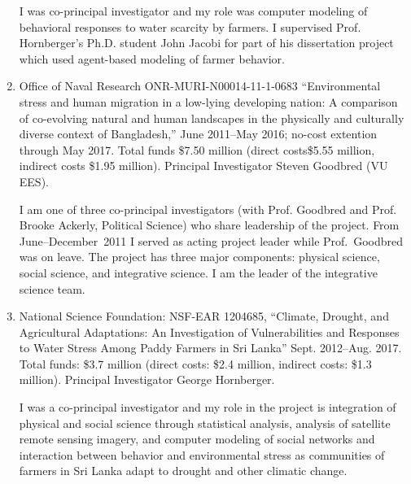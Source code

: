\begin{enumerate}
\begin{credit}
I was co-principal investigator and my role was computer modeling of behavioral responses to water scarcity by farmers. I supervised Prof. Hornberger's Ph.D. student John Jacobi for part of his dissertation project which used agent-based modeling of farmer behavior.
\end{credit}
	\item Office of Naval Research ONR-MURI-N00014-11-1-0683 ``Environmental stress and human migration in a low-lying developing nation: A comparison of co-evolving natural and human landscapes in the physically and culturally diverse context of Bangladesh,'' June 2011--May 2016; no-cost extention through May 2017. Total funds \$7.50 million (direct costs\$5.55 million, indirect costs \$1.95 million). Principal Investigator Steven Goodbred (VU EES).
\begin{credit}
I am one of three co-principal investigators (with Prof. Goodbred and Prof. Brooke Ackerly, Political Science) who share leadership of the project. From June--December~2011 I served as acting project leader while Prof.~Goodbred was on leave. The project has three major components: physical science, social science, and integrative science. I am the leader of the integrative science team.
\end{credit}
	\item National Science Foundation: NSF-EAR 1204685, ``Climate, Drought, and Agricultural Adaptations: An Investigation of Vulnerabilities and Responses to Water Stress Among Paddy Farmers in Sri Lanka'' Sept. 2012--Aug. 2017. Total funds: \$3.7 million (direct costs: \$2.4 million, indirect costs: \$1.3 million). Principal Investigator George Hornberger.
\begin{credit}
I was a co-principal investigator and my role in the project is integration of physical and social science through statistical analysis, analysis of satellite remote sensing imagery, and computer modeling of social networks and interaction between behavior and environmental stress as communities of farmers in Sri Lanka adapt to drought and other climatic change.
\end{credit}
\end{enumerate}
\iffalse
